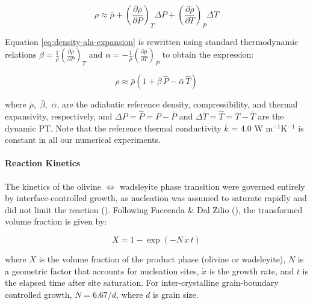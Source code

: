 \documentclass[
  paper=a4,
  ,captions=tableheading
]{scrartcl}
\begin{document}
\begin{equation}
  \rho \approx \bar{\rho} + \left(\frac{\partial \bar{\rho}}{\partial P} \right)_T \Delta P + \left(\frac{\partial \bar{\rho}}{\partial T} \right)_P \Delta T
  \label{eq:density-ala-expansion}
\end{equation}

Equation \ref{eq:density-ala-expansion} is rewritten using standard
thermodynamic relations
\(\beta = \frac{1}{\rho} \left(\frac{\partial \rho}{\partial P}\right)_T\)
and
\(\alpha = -\frac{1}{\rho} \left(\frac{\partial \rho}{\partial T}\right)_P\)
to obtain the expression:

\begin{equation}
  \rho \approx \bar{\rho} \left(1 + \bar{\beta}\, \hat{P} - \bar{\alpha}\, \hat{T} \right)
  \label{eq:density-ala}
\end{equation}

where \(\bar{\rho}\), \(\, \bar{\beta}\), \(\, \bar{\alpha}\), are the
adiabatic reference density, compressibility, and thermal expansivity,
respectively, and \(\Delta P = \hat{P} = P - \bar{P}\) and
\(\Delta T = \hat{T} = T - \bar{T}\) are the dynamic PT. Note that the
reference thermal conductivity \(\bar{k}\) = 4.0 W m\(^{-1}\)K\(^{-1}\)
is constant in all our numerical experiments.

\paragraph{Reaction Kinetics}\label{sec:reaction-kinetics}

The kinetics of the olivine \(\Leftrightarrow\) wadsleyite phase
transition were governed entirely by interface-controlled growth, as
nucleation was assumed to saturate rapidly and did not limit the
reaction (). Following Faccenda \&
Dal Zilio (), the transformed volume
fraction is given by:

\begin{equation}
  X = 1 - \exp\!\left(-N\, \dot{x}\, t \right)
  \label{eq:volume-fraction}
\end{equation}

where \(X\) is the volume fraction of the product phase (olivine or
wadsleyite), \(N\) is a geometric factor that accounts for nucleation
sites, \(\dot{x}\) is the growth rate, and \(t\) is the elapsed time
after site saturation. For inter-crystalline grain-boundary controlled
growth, \(N = 6.67/d\), where \(d\) is grain size.
\end{document}
